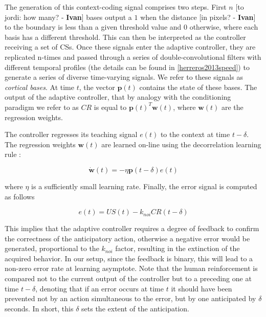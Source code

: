 \documentclass[letterpaper, 10 pt, conference]{ieeeconf}  %
\newcommand\ih[1]{{\color{red}}{\color{red}}{\footnotesize \color{red}[#1 - \textbf{Ivan}]}} %
\begin{document}
{The generation of this context-coding signal comprises two steps. First $n$ \ih{to jordi: how many?} bases output a $1$ when the distance \ih{in pixels?} to the boundary is less than a given threshold value and $0$ otherwise, where each basis has a different threshold. This can then be interpreted as the controller receiving a set of CSs. Once these signals enter the adaptive controller, they are replicated n-times and passed through a series of double-convolutional filters with different temporal profiles (the details can be found in \ref{herreros2013speed}) to generate a series of diverse time-varying signals. We refer to these signals as \emph{cortical bases}. At time $t$, the vector $\mathbf{p}(t)$ contains the state of these bases. The output of the adaptive controller, that by analogy with the conditioning paradigm we refer to as $CR$ is equal to $\mathbf{p}(t)^T \mathbf{w}(t)$, where $\mathbf{w}(t)$ are the regression weights.

The controller regresses its teaching signal $e(t)$ to the context at time $t-\delta$. The regression weights $\mathbf{w}(t)$ are learned on-line using the decorrelation learning rule \cite{fujita1982adaptive}:

\[
\dot{\mathbf{w}}(t) = -\eta \mathbf{p}(t-\delta) e(t)
\]

where $\eta$ is a sufficiently small learning rate. Finally, the error signal is computed as follows

\[
e(t) = US(t) - k_{noi} CR(t-\delta)
\]

This implies that the adaptive controller requires a degree of feedback to confirm the correctness of the anticipatory action, otherwise a negative error would be generated, proportional to the $k_{noi}$ factor, resulting in the extinction of the acquired behavior. In our setup, since the feedback is binary, this will lead to a non-zero error rate at learning asymptote. Note that the human reinforcement is compared not to the current output of the controller but to a preceding one at time $t-\delta$, denoting that if an error occurs at time $t$ it should have been prevented not by an action simultaneous to the error, but by one anticipated by $\delta$ seconds. In short, this $\delta$ sets the extent of the anticipation.





}
\end{document}
